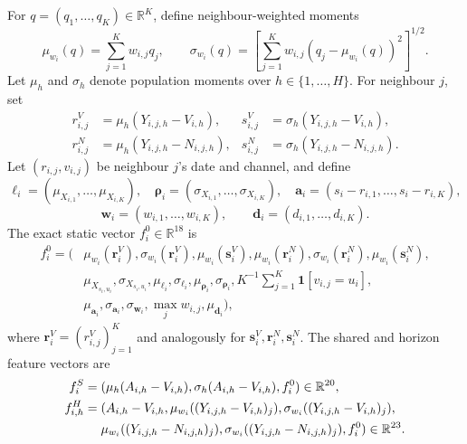 \documentclass[10pt]{article}
\newcommand{\reals}{\mathbb{R}}
\begin{document}
For $q=(q_1,\ldots,q_K)\in\reals^K$, define neighbour-weighted moments
\[
 \mu_{w_i}(q)=\sum_{j=1}^K w_{i,j}q_j,\qquad
 \sigma_{w_i}(q)=
 \left[\sum_{j=1}^K w_{i,j}(q_j-\mu_{w_i}(q))^2\right]^{1/2}.
\]
Let $\mu_h$ and $\sigma_h$ denote population moments over
$h\in\{1,\ldots,H\}$. For neighbour $j$, set
\begin{align*}
 r^V_{i,j}&=\mu_h(Y_{i,j,h}-V_{i,h}),
 &s^V_{i,j}&=\sigma_h(Y_{i,j,h}-V_{i,h}),\\
 r^N_{i,j}&=\mu_h(Y_{i,j,h}-N_{i,j,h}),
 &s^N_{i,j}&=\sigma_h(Y_{i,j,h}-N_{i,j,h}).
\end{align*}
Let $(r_{i,j},v_{i,j})$ be neighbour $j$'s date and channel, and define
\[
 \bm\ell_i=(\mu_{X_{i,1}},\ldots,\mu_{X_{i,K}}),\quad
 \bm\rho_i=(\sigma_{X_{i,1}},\ldots,\sigma_{X_{i,K}}),\quad
 \bm a_i=(s_i-r_{i,1},\ldots,s_i-r_{i,K}),
\]
\[
 \bm w_i=(w_{i,1},\ldots,w_{i,K}),\qquad
 \bm d_i=(d_{i,1},\ldots,d_{i,K}).
\]
The exact static vector $f_i^0\in\reals^{18}$ is
\begin{align*}
f_i^0=(&
 \mu_{w_i}(\bm r_i^V),\sigma_{w_i}(\bm r_i^V),\mu_{w_i}(\bm s_i^V),
 \mu_{w_i}(\bm r_i^N),\sigma_{w_i}(\bm r_i^N),\mu_{w_i}(\bm s_i^N),\\
&\mu_{X_{s_i,u_i}},\sigma_{X_{s_i,u_i}},
 \mu_{\bm\ell_i},\sigma_{\bm\ell_i},\mu_{\bm\rho_i},\sigma_{\bm\rho_i},
 K^{-1}\textstyle\sum_{j=1}^K\mathbf1[v_{i,j}=u_i],\\
&\mu_{\bm a_i},\sigma_{\bm a_i},\sigma_{\bm w_i},
 \max_j w_{i,j},\mu_{\bm d_i}),
\end{align*}
where $\bm r_i^V=(r^V_{i,j})_{j=1}^K$ and analogously for
$\bm s_i^V,\bm r_i^N,\bm s_i^N$. The shared and horizon feature vectors are
\begin{align}
 f_i^S={}&(\mu_h(A_{i,h}-V_{i,h}),\sigma_h(A_{i,h}-V_{i,h}),f_i^0)
 \in\reals^{20},\label{eq:shared-gate-features}\\
 f_{i,h}^H={}&(A_{i,h}-V_{i,h},
 \mu_{w_i}((Y_{i,j,h}-V_{i,h})_j),
 \sigma_{w_i}((Y_{i,j,h}-V_{i,h})_j),\notag\\
 &\mu_{w_i}((Y_{i,j,h}-N_{i,j,h})_j),
 \sigma_{w_i}((Y_{i,j,h}-N_{i,j,h})_j),f_i^0)
 \in\reals^{23}.\label{eq:horizon-gate-features}
\end{align}
\end{document}
